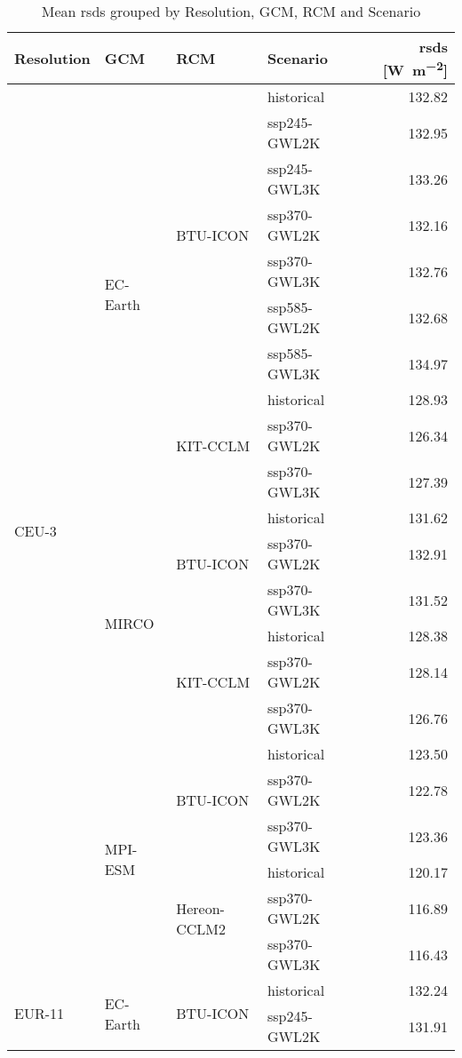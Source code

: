 \begin{table}[!htbp]
\centering
\footnotesize
\caption{Mean rsds grouped by Resolution, GCM, RCM and Scenario}
\label{Table:rsds_mean_values}
\begin{tabular}{lll|l|r}
\toprule
Resolution & GCM & RCM & Scenario & rsds [\si{\watt\per\square\meter}] \\
\midrule
\multirow{22}{*}{CEU-3} & \multirow{10}{*}{EC-Earth} & \multirow{7}{*}{BTU-ICON} & historical & 132.82 \\
 &  &  & ssp245-GWL2K & 132.95 \\
 &  &  & ssp245-GWL3K & 133.26 \\
 &  &  & ssp370-GWL2K & 132.16 \\
 &  &  & ssp370-GWL3K & 132.76 \\
 &  &  & ssp585-GWL2K & 132.68 \\
 &  &  & ssp585-GWL3K & 134.97 \\
\cmidrule(lr){3-5}
 &  & \multirow{3}{*}{KIT-CCLM} & historical & 128.93 \\
 &  &  & ssp370-GWL2K & 126.34 \\
 &  &  & ssp370-GWL3K & 127.39 \\
\cmidrule(lr){3-5}
\cmidrule(lr){2-5}
 & \multirow{6}{*}{MIRCO} & \multirow{3}{*}{BTU-ICON} & historical & 131.62 \\
 &  &  & ssp370-GWL2K & 132.91 \\
 &  &  & ssp370-GWL3K & 131.52 \\
\cmidrule(lr){3-5}
 &  & \multirow{3}{*}{KIT-CCLM} & historical & 128.38 \\
 &  &  & ssp370-GWL2K & 128.14 \\
 &  &  & ssp370-GWL3K & 126.76 \\
\cmidrule(lr){3-5}
\cmidrule(lr){2-5}
 & \multirow{6}{*}{MPI-ESM} & \multirow{3}{*}{BTU-ICON} & historical & 123.50 \\
 &  &  & ssp370-GWL2K & 122.78 \\
 &  &  & ssp370-GWL3K & 123.36 \\
\cmidrule(lr){3-5}
 &  & \multirow{3}{*}{Hereon-CCLM2} & historical & 120.17 \\
 &  &  & ssp370-GWL2K & 116.89 \\
 &  &  & ssp370-GWL3K & 116.43 \\
\midrule
\multirow{22}{*}{EUR-11} & \multirow{10}{*}{EC-Earth} & \multirow{7}{*}{BTU-ICON} & historical & 132.24 \\
 &  &  & ssp245-GWL2K & 131.91 \\

\end{tabular}
\end{table}
